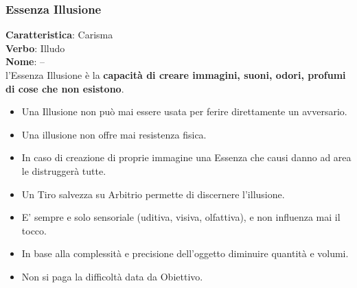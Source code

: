 \documentclass[a4paper,10 pt,twoside,openany]{book}
\begin{document}
\subsubsection{Essenza Illusione}

\label{essenza-illusione---magnetismo}

\textbf{Caratteristica}: Carisma\\
\textbf{Verbo}: Illudo\\
\textbf{Nome}: --\\

l'Essenza Illusione è la \textbf{capacità di creare immagini, suoni, odori, profumi di cose che non esistono}.
\begin{itemize}
	\item
	Una Illusione non può mai essere usata per ferire direttamente un avversario.
	\item
	Una illusione non offre mai resistenza fisica.
	\item
	In caso di creazione di proprie immagine una Essenza che causi danno ad area le distruggerà tutte.
	\item
	Un Tiro salvezza su Arbitrio permette di discernere l'illusione.
	\item
	E' sempre e solo sensoriale (uditiva, visiva, olfattiva), e non influenza mai il tocco.
	\item
	In base alla complessità e precisione dell'oggetto diminuire quantità e volumi.
	\item
	Non si paga la difficoltà data da Obiettivo.
\end{itemize}

\bigskip
\end{document}
